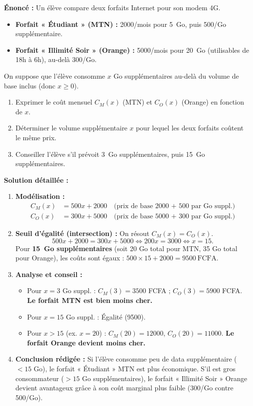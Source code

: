 \documentclass[11pt]{article}
\begin{document}
\begin{exoresolu}
\textbf{Énoncé :} Un élève compare deux forfaits Internet pour son modem 4G.
\begin{itemize}
    \item \textbf{Forfait « Étudiant » (MTN) :} \SI{2000}{}/mois pour \SI{5}{Go}, puis \SI{500}{}/Go supplémentaire.
    \item \textbf{Forfait « Illimité Soir » (Orange) :} \SI{5000}{}/mois pour \SI{20}{Go} (utilisables de 18h à 6h), au-delà \SI{300}{}/Go.
\end{itemize}
On suppose que l'élève consomme $x$ Go supplémentaires au-delà du volume de base inclus (donc $x \ge 0$).
\begin{enumerate}
    \item Exprimer le coût mensuel $C_M(x)$ (MTN) et $C_O(x)$ (Orange) en fonction de $x$.
    \item Déterminer le volume supplémentaire $x$ pour lequel les deux forfaits coûtent le même prix.
    \item Conseiller l'élève s'il prévoit \SI{3}{Go} supplémentaires, puis \SI{15}{Go} supplémentaires.
\end{enumerate}

\textbf{Solution détaillée :}
\begin{enumerate}
    \item \textbf{Modélisation :}
    \begin{align*}
        C_M(x) &= 500x + 2000 \quad \text{(prix de base 2000 + 500 par Go suppl.)} \\
        C_O(x) &= 300x + 5000 \quad \text{(prix de base 5000 + 300 par Go suppl.)}
    \end{align*}
    \item \textbf{Seuil d'égalité (intersection) :} On résout $C_M(x) = C_O(x)$.
    \[
    500x + 2000 = 300x + 5000 \iff 200x = 3000 \iff x = 15.
    \]
    Pour \textbf{\SI{15}{Go} supplémentaires} (soit 20 Go total pour MTN, 35 Go total pour Orange), les coûts sont égaux : $500 \times 15 + 2000 = \SI{9500}{\text{FCFA}}$.
    \item \textbf{Analyse et conseil :}
    \begin{itemize}
        \item Pour $x = 3$ Go suppl. : $C_M(3) = 3500$ FCFA ; $C_O(3) = 5900$ FCFA. \textbf{Le forfait MTN est bien moins cher.}
        \item Pour $x = 15$ Go suppl. : Égalité (\SI{9500}{}).
        \item Pour $x > 15$ (ex. $x=20$) : $C_M(20)=12000$, $C_O(20)=11000$. \textbf{Le forfait Orange devient moins cher.}
    \end{itemize}
    \item \textbf{Conclusion rédigée :} Si l'élève consomme peu de data supplémentaire ($< 15$ Go), le forfait « Étudiant » MTN est plus économique. S'il est gros consommateur ($> 15$ Go supplémentaires), le forfait « Illimité Soir » Orange devient avantageux grâce à son coût marginal plus faible (\SI{300}{}/Go contre \SI{500}{}/Go).
\end{enumerate}
\end{exoresolu}
\end{document}
